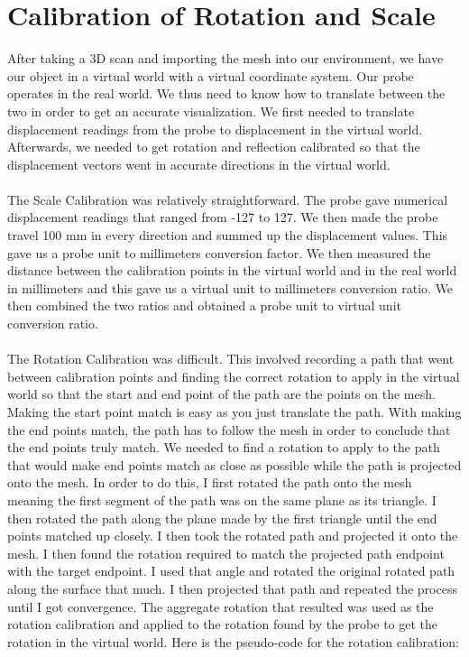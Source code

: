 \documentclass[conference]{acmsiggraph}
\begin{document}
\section{Calibration of Rotation and Scale}

After taking a 3D scan and importing the mesh into our environment, we have our object in a virtual world with a virtual coordinate system. Our probe operates in the real world. We thus need to know how to translate between the two in order to get an accurate visualization. We first needed to translate displacement readings from the probe to displacement in the virtual world. Afterwards, we needed to get rotation and reflection calibrated so that the displacement vectors went in accurate directions in the virtual world. \\
\\
The Scale Calibration was relatively straightforward. The probe gave numerical displacement readings that ranged from -127 to 127. We then made the probe travel 100 mm in every direction and summed up the displacement values. This gave us a probe unit to millimeters conversion factor. We then measured the distance between the calibration points in the virtual world and in the real world in millimeters and this gave us a virtual unit to millimeters conversion ratio. We then combined the two ratios and obtained a probe unit to virtual unit conversion ratio. \\
\\
The Rotation Calibration was difficult. This involved recording a path that went between calibration points and finding the correct rotation to apply in the virtual world so that the start and end point of the path are the points on the mesh. Making the start point match is easy as you just translate the path. With making the end points match, the path has to follow the mesh in order to conclude that the end points truly match. We needed to find a rotation to apply to the path that would make end points match as close as possible while the path is projected onto the mesh. In order to do this, I first rotated the path onto the mesh meaning the first segment of the path was on the same plane as its triangle. I then rotated the path along the plane made by the first triangle until the end points matched up closely. I then took the rotated path and projected it onto the mesh. I then found the rotation required to match the projected path endpoint with the target endpoint. I used that angle and rotated the original rotated path along the surface that much. I then projected that path and repeated the process until I got convergence. The aggregate rotation that resulted was used as the rotation calibration and applied to the rotation found by the probe to get the rotation in the virtual world. Here is the pseudo-code for the rotation calibration:
\end{document}
